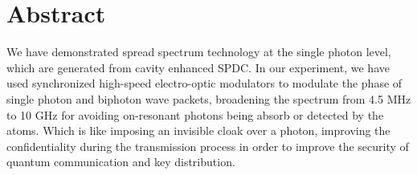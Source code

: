\documentclass[class=NCU_thesis, crop=false]{standalone}
\begin{document}
\chapter{Abstract}
We have demonstrated spread spectrum technology at the single photon level, which are generated from cavity enhanced SPDC. In our experiment, we have used synchronized high-speed electro-optic modulators to modulate the phase of single photon and biphoton wave packets, broadening the spectrum from 4.5 MHz to 10 GHz for avoiding on-resonant photons being absorb or detected by the atoms. Which is like imposing an invisible cloak over a photon, improving the confidentiality during the transmission process in order to improve the security of quantum communication and key distribution.

\vspace{2em}
\end{document}

